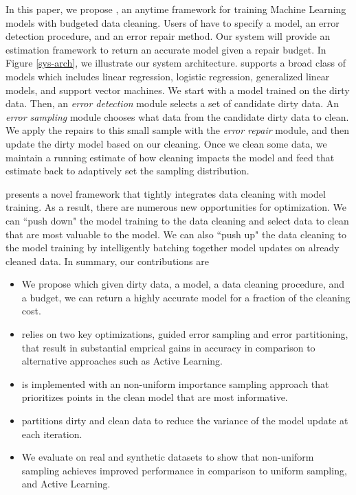 In this paper, we propose \sys, an anytime framework for training Machine Learning models with budgeted data cleaning.
Users of \sys have to specify a model, an error detection procedure, and an error repair method.
Our system will provide an estimation framework to return an accurate model given a repair budget.
In Figure \ref{sys-arch}, we illustrate our system architecture.
\sys supports a broad class of models which includes linear regression, logistic regression, generalized linear models, and support vector machines.
We start with a model trained on the dirty data.
Then, an \emph{error detection} module selects a set of candidate dirty data.
An \emph{error sampling} module chooses what data from the candidate dirty data to clean.
We apply the repairs to this small sample with the \emph{error repair} module, and then update the dirty model based on our cleaning.
Once we clean some data, we maintain a running estimate of how cleaning impacts the model and feed that estimate back to adaptively set the sampling distribution.

\sys presents a novel framework that tightly integrates data cleaning with model training.
As a result, there are numerous new opportunities for optimization.
We can ``push down" the model training to the data cleaning and select data to clean that are most valuable to the model.
We can also ``push up" the data cleaning to the model training by intelligently batching together model updates on already cleaned data.
In summary, our contributions are
\begin{itemize}[noitemsep]
\item We propose \sysfull which given dirty data, a model, a data cleaning procedure, and a budget, we can return a highly accurate model for a fraction of the cleaning cost.
\item \sys relies on two key optimizations, guided error sampling and error partitioning, that result in substantial emprical gains in accuracy in comparison to alternative approaches such as Active Learning.
\item \sys is implemented with an non-uniform importance sampling approach that prioritizes points in the clean model that are most informative.
\item \sys partitions dirty and clean data to reduce the variance of the model update at each iteration.
\item We evaluate \sysfull on real and synthetic datasets to show that non-uniform sampling achieves improved performance in comparison to uniform sampling, and Active Learning.
\end{itemize}









